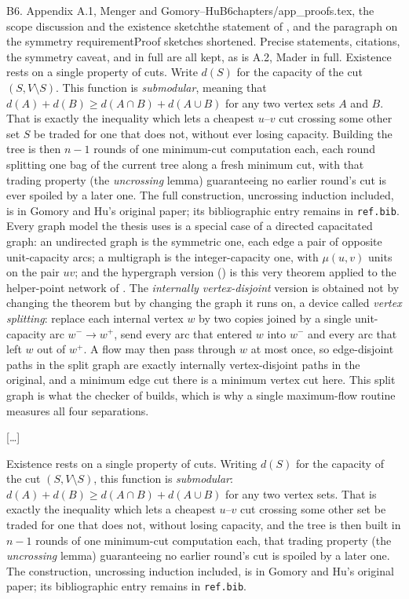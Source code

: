 \begin{offcutrewrite}{B6. Appendix A.1, Menger and Gomory--Hu}{B6}{chapters/app\_proofs.tex, the scope discussion and the existence sketch}{the statement of , and the paragraph on the symmetry requirement}{Proof sketches shortened. Precise statements, citations, the symmetry caveat, and  in full are all kept, as is A.2, Mader in full.}
Existence rests on a single property of cuts. Write $d(S)$ for the capacity of the cut $(S, V \setminus S)$. This function is \emph{submodular}, meaning that $d(A) + d(B) \ge d(A \cap B) + d(A \cup B)$ for any two vertex sets $A$ and $B$. That is exactly the inequality which lets a cheapest $u$--$v$ cut crossing some other set $S$ be traded for one that does not, without ever losing capacity. Building the tree is then $n-1$ rounds of one minimum-cut computation each, each round splitting one bag of the current tree along a fresh minimum cut, with that trading property (the \emph{uncrossing} lemma) guaranteeing no earlier round's cut is ever spoiled by a later one. The full construction, uncrossing induction included, is in Gomory and Hu's original paper; its bibliographic entry remains in \texttt{ref.bib}.
\nowreads
Every graph model the thesis uses is a special case of a directed capacitated graph: an undirected graph is the symmetric one, each edge a pair of opposite unit-capacity arcs; a multigraph is the integer-capacity one, with $\mu(u,v)$ units on the pair $uv$; and the hypergraph version () is this very theorem applied to the helper-point network of . The \emph{internally vertex-disjoint} version is obtained not by changing the theorem but by changing the graph it runs on, a device called \emph{vertex splitting}: replace each internal vertex $w$ by two copies joined by a single unit-capacity arc $w^- \to w^+$, send every arc that entered $w$ into $w^-$ and every arc that left $w$ out of $w^+$. A flow may then pass through $w$ at most once, so edge-disjoint paths in the split graph are exactly internally vertex-disjoint paths in the original, and a minimum edge cut there is a minimum vertex cut here. This split graph is what the checker of  builds, which is why a single maximum-flow routine measures all four separations.

[\dots]

Existence rests on a single property of cuts. Writing $d(S)$ for the capacity of the cut $(S, V \setminus S)$, this function is \emph{submodular}: $d(A) + d(B) \ge d(A \cap B) + d(A \cup B)$ for any two vertex sets. That is exactly the inequality which lets a cheapest $u$--$v$ cut crossing some other set be traded for one that does not, without losing capacity, and the tree is then built in $n-1$ rounds of one minimum-cut computation each, that trading property (the \emph{uncrossing} lemma) guaranteeing no earlier round's cut is spoiled by a later one. The construction, uncrossing induction included, is in Gomory and Hu's original paper; its bibliographic entry remains in \texttt{ref.bib}.
\end{offcutrewrite}

